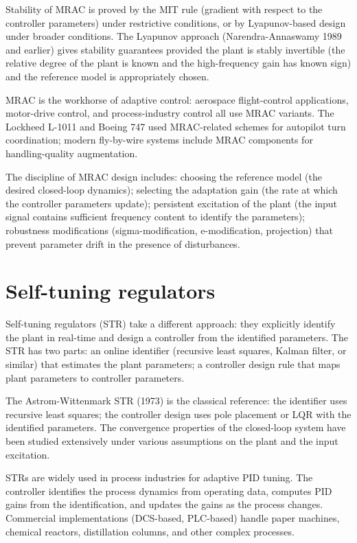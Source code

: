 Stability of MRAC is proved by the MIT rule (gradient with respect to the controller parameters) under restrictive conditions, or by Lyapunov-based design under broader conditions. The Lyapunov approach (Narendra-Annaswamy 1989 and earlier) gives stability guarantees provided the plant is stably invertible (the relative degree of the plant is known and the high-frequency gain has known sign) and the reference model is appropriately chosen.

MRAC is the workhorse of adaptive control: aerospace flight-control applications, motor-drive control, and process-industry control all use MRAC variants. The Lockheed L-1011 and Boeing 747 used MRAC-related schemes for autopilot turn coordination; modern fly-by-wire systems include MRAC components for handling-quality augmentation.

The discipline of MRAC design includes: choosing the reference model (the desired closed-loop dynamics); selecting the adaptation gain (the rate at which the controller parameters update); persistent excitation of the plant (the input signal contains sufficient frequency content to identify the parameters); robustness modifications (sigma-modification, e-modification, projection) that prevent parameter drift in the presence of disturbances.

\section{Self-tuning regulators}

Self-tuning regulators (STR) take a different approach: they explicitly identify the plant in real-time and design a controller from the identified parameters. The STR has two parts: an online identifier (recursive least squares, Kalman filter, or similar) that estimates the plant parameters; a controller design rule that maps plant parameters to controller parameters.

The Astrom-Wittenmark STR (1973) is the classical reference: the identifier uses recursive least squares; the controller design uses pole placement or LQR with the identified parameters. The convergence properties of the closed-loop system have been studied extensively under various assumptions on the plant and the input excitation.

STRs are widely used in process industries for adaptive PID tuning. The controller identifies the process dynamics from operating data, computes PID gains from the identification, and updates the gains as the process changes. Commercial implementations (DCS-based, PLC-based) handle paper machines, chemical reactors, distillation columns, and other complex processes.

